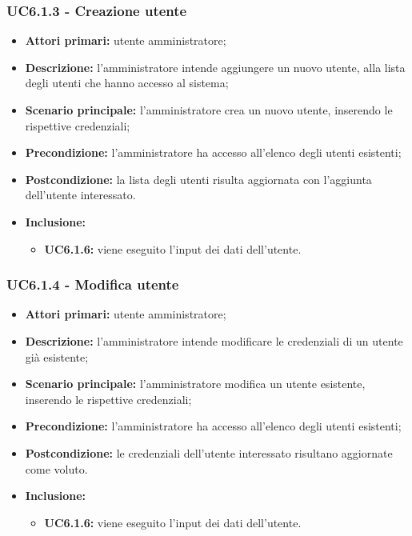 \subsubsection{UC6.1.3 - Creazione utente}
	\begin{itemize}
		\item \textbf{Attori primari:} utente amministratore;
		\item \textbf{Descrizione:} l'amministratore intende aggiungere un nuovo utente, alla lista degli utenti che hanno accesso al sistema;
		\item \textbf{Scenario principale:} l'amministratore crea un nuovo utente, inserendo le rispettive credenziali;
		\item \textbf{Precondizione:} l'amministratore ha accesso all'elenco degli utenti esistenti;
		\item \textbf{Postcondizione:} la lista degli utenti risulta aggiornata con l'aggiunta dell'utente interessato.
		\item \textbf{Inclusione:} 
		\begin{itemize}
			\item \textbf{UC6.1.6:} viene eseguito l'input dei dati dell'utente.
		\end{itemize}
	\end{itemize}

\subsubsection{UC6.1.4 - Modifica utente}
	\begin{itemize}
		\item \textbf{Attori primari:} utente amministratore;
		\item \textbf{Descrizione:} l'amministratore intende modificare le credenziali di un utente già esistente;
		\item \textbf{Scenario principale:} l'amministratore modifica un utente esistente, inserendo le rispettive credenziali;
		\item \textbf{Precondizione:} l'amministratore ha accesso all'elenco degli utenti esistenti;
		\item \textbf{Postcondizione:} le credenziali dell'utente interessato risultano aggiornate come voluto.
		\item \textbf{Inclusione:} 
		\begin{itemize}
			\item \textbf{UC6.1.6:} viene eseguito l'input dei dati dell'utente.
		\end{itemize}
	\end{itemize}

